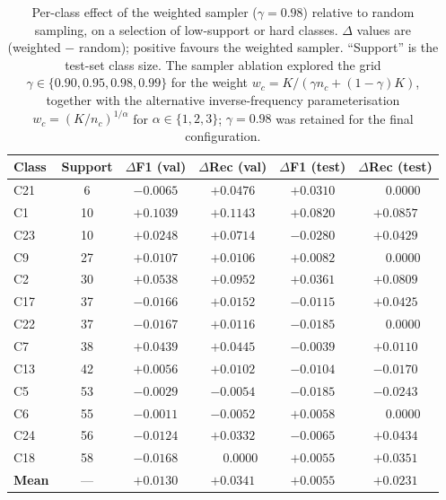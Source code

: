 \documentclass[11pt]{article}
\begin{document}
\begin{table}[t]
\centering
\caption{Per-class effect of the weighted sampler ($\gamma = 0.98$)
relative to random sampling, on a selection of low-support or hard
classes. $\Delta$ values are (weighted $-$ random); positive favours the
weighted sampler. ``Support'' is the test-set class size. The sampler
ablation explored the grid $\gamma \in \{0.90, 0.95, 0.98, 0.99\}$ for the
weight $w_c = K/(\gamma n_c + (1-\gamma) K)$, together with the alternative
inverse-frequency parameterisation $w_c = (K/n_c)^{1/\alpha}$ for
$\alpha \in \{1, 2, 3\}$; $\gamma = 0.98$ was retained for the final
configuration.}
\label{tab:sampler_per_class}
\small
\setlength{\tabcolsep}{6pt}
\renewcommand{\arraystretch}{1.1}
\begin{tabular}{lccccc}
\toprule
\textbf{Class} & \textbf{Support}
& $\Delta$\textbf{F1 (val)} & $\Delta$\textbf{Rec (val)}
& $\Delta$\textbf{F1 (test)} & $\Delta$\textbf{Rec (test)} \\
\midrule
C21 & 6   & $-0.0065$ & $+0.0476$ & $+0.0310$ & $\phantom{+}0.0000$ \\
C1  & 10  & $+0.1039$ & $+0.1143$ & $+0.0820$ & $+0.0857$ \\
C23 & 10  & $+0.0248$ & $+0.0714$ & $-0.0280$ & $+0.0429$ \\
C9  & 27  & $+0.0107$ & $+0.0106$ & $+0.0082$ & $\phantom{+}0.0000$ \\
C2  & 30  & $+0.0538$ & $+0.0952$ & $+0.0361$ & $+0.0809$ \\
C17 & 37  & $-0.0166$ & $+0.0152$ & $-0.0115$ & $+0.0425$ \\
C22 & 37  & $-0.0167$ & $+0.0116$ & $-0.0185$ & $\phantom{+}0.0000$ \\
C7  & 38  & $+0.0439$ & $+0.0445$ & $-0.0039$ & $+0.0110$ \\
C13 & 42  & $+0.0056$ & $+0.0102$ & $-0.0104$ & $-0.0170$ \\
C5  & 53  & $-0.0029$ & $-0.0054$ & $-0.0185$ & $-0.0243$ \\
C6  & 55  & $-0.0011$ & $-0.0052$ & $+0.0058$ & $\phantom{+}0.0000$ \\
C24 & 56  & $-0.0124$ & $+0.0332$ & $-0.0065$ & $+0.0434$ \\
C18 & 58  & $-0.0168$ & $\phantom{+}0.0000$ & $+0.0055$ & $+0.0351$ \\
\midrule
\textbf{Mean} & --- & $\mathbf{+0.0130}$ & $\mathbf{+0.0341}$ & $\mathbf{+0.0055}$ & $\mathbf{+0.0231}$ \\
\bottomrule
\end{tabular}
\end{table}
\end{document}
